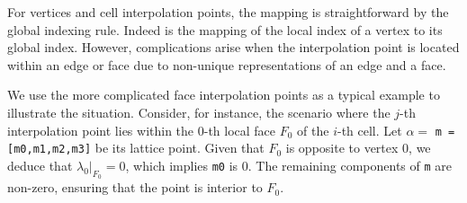 \documentclass[mathpazo]{cicp}
\begin{document}
For vertices and cell interpolation points, the mapping is straightforward by
the global indexing rule. Indeed  is the mapping of the local index of a vertex to its global index. 
However, complications arise when the
interpolation point is located within an edge or face due to non-unique representations of an edge and a face. 

We use the more complicated face interpolation points as a typical example to illustrate the situation. 
Consider, for instance, the scenario where the $j$-th interpolation point lies
within the $0$-th local face \(F_0\) of the $i$-th cell. Let \(\alpha = \)
\lstinline{m = [m0,m1,m2,m3]} be its lattice point. Given that \(F_0\) is
opposite to vertex $0$, we deduce that \(\lambda_0|_{F_0} = 0\), which implies
\lstinline{m0} is $0$. The remaining components of \lstinline{m} are non-zero,
ensuring that the point is interior to \(F_0\). 
\end{document}
